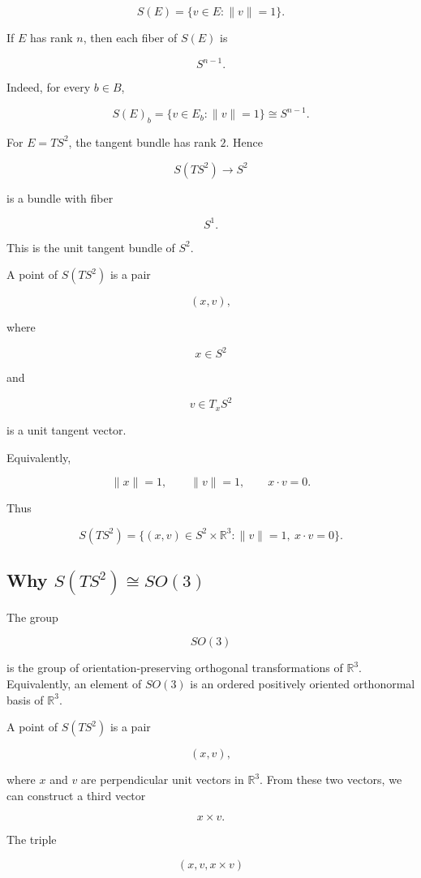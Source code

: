 \documentclass[12pt,a4paper]{article}
\newcommand{\R}{\mathbb{R}}
\theoremstyle{notespace}
\begin{document}
	\[
	S(E)=\{v\in E:\|v\|=1\}.
	\]
	
	If \(E\) has rank \(n\), then each fiber of \(S(E)\) is
	
	\[
	S^{n-1}.
	\]
	
	Indeed, for every \(b\in B\),
	
	\[
	S(E)_b
	=
	\{v\in E_b:\|v\|=1\}
	\cong S^{n-1}.
	\]
	
	For \(E=TS^{2}\), the tangent bundle has rank \(2\). Hence
	
	\[
	S(TS^{2})\to S^{2}
	\]
	
	is a bundle with fiber
	
	\[
	S^{1}.
	\]
	
	This is the unit tangent bundle of \(S^{2}\).
	
	A point of \(S(TS^{2})\) is a pair
	
	\[
	(x,v),
	\]
	
	where
	
	\[
	x\in S^{2}
	\]
	
	and
	
	\[
	v\in T_xS^{2}
	\]
	
	is a unit tangent vector.
	
	Equivalently,
	
	\[
	\|x\|=1,
	\qquad
	\|v\|=1,
	\qquad
	x\cdot v=0.
	\]
	
	Thus
	
	\[
	S(TS^{2})
	=
	\{(x,v)\in S^{2}\times \R^{3}:\|v\|=1,\ x\cdot v=0\}.
	\]
	
	\subsection{Why \(S(TS^{2})\cong SO(3)\)}
	
	The group
	
	\[
	SO(3)
	\]
	
	is the group of orientation-preserving orthogonal transformations of \(\R^{3}\). Equivalently, an element of \(SO(3)\) is an ordered positively oriented orthonormal basis of \(\R^{3}\).
	
	A point of \(S(TS^{2})\) is a pair
	
	\[
	(x,v),
	\]
	
	where \(x\) and \(v\) are perpendicular unit vectors in \(\R^{3}\). From these two vectors, we can construct a third vector
	
	\[
	x\times v.
	\]
	
	The triple
	
	\[
	(x,v,x\times v)
	\]
	
\end{document}
